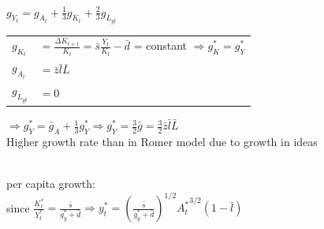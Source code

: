\documentclass[12pt,landscape]{article}
\begin{document}
\begin{multicols}{3}
\ \\
$g_{Y_t} = g_{A_t} + \frac{1}{3}g_{K_t} + \frac{2}{3}g_{L_{yt}}$
\begin{tabulary}{\linewidth}{ll}
	$g_{K_t}$ & $= \frac{\Delta K_{t+1}}{K_t} = \bar s \frac{Y_t}{K_t} - \bar d$ = constant $\Rightarrow g_K^* = g_Y^*$\\
	$g_{A_t}$ & $= \bar z \bar l \bar L$\\
	$g_{L_{yt}}$ & $= 0$
\end{tabulary}
$\Rightarrow g_Y^* = \bar g_A + \frac{1}{3}g_Y^* \Rightarrow g_Y^* = \frac{3}{2}\bar g = \frac{3}{2}\bar z \bar l \bar L$\\
Higher growth rate than in Romer model due to growth in ideas

\ \\
per capita growth:\\
since $\frac{K^*_t}{Y_t^*} = \frac{\bar s}{g_y^* + \bar d} \Rightarrow y_t^* = (\frac{\bar s}{g_y^* + \bar d})^{1/2}{A_t^*}^{3/2}(1-\bar l)$

\end{multicols}
\end{document}
